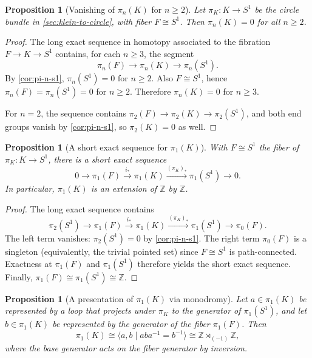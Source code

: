 \documentclass[11pt,a4paper]{article}
\newtheorem{proposition}[theorem]{Proposition}
\theoremstyle{definition}
\theoremstyle{remark}
\begin{document}
\begin{proposition}[Vanishing of \(\pi_n(K)\) for \(n\ge 2\)]
\label{prop:pi-n-klein}
Let \(\pi_K:K\to S^1\) be the circle bundle in \cref{sec:klein-to-circle}, with fiber \(F\cong S^1\). Then \(\pi_n(K)=0\) for all \(n\ge 2\).
\end{proposition}

\begin{proof}
The long exact sequence in homotopy associated to the fibration \(F\to K\to S^1\) contains, for each \(n\ge 3\), the segment
\[
\pi_n(F)\to \pi_n(K)\to \pi_n(S^1).
\]
By \cref{cor:pi-n-s1}, \(\pi_n(S^1)=0\) for \(n\ge 2\). Also \(F\cong S^1\), hence \(\pi_n(F)=\pi_n(S^1)=0\) for \(n\ge 2\). Therefore \(\pi_n(K)=0\) for \(n\ge 3\).

For \(n=2\), the sequence contains \(\pi_2(F)\to \pi_2(K)\to \pi_2(S^1)\), and both end groups vanish by \cref{cor:pi-n-s1}, so \(\pi_2(K)=0\) as well.
\end{proof}

\begin{proposition}[A short exact sequence for \(\pi_1(K)\)]
\label{prop:pi1-short-exact}
With \(F\cong S^1\) the fiber of \(\pi_K:K\to S^1\), there is a short exact sequence
\[
0 \longrightarrow \pi_1(F) \xrightarrow{i_*} \pi_1(K) \xrightarrow{(\pi_K)_*} \pi_1(S^1) \longrightarrow 0.
\]
In particular, \(\pi_1(K)\) is an extension of \(\mathbb{Z}\) by \(\mathbb{Z}\).
\end{proposition}

\begin{proof}
The long exact sequence contains
\[
\pi_2(S^1)\to \pi_1(F)\xrightarrow{i_*}\pi_1(K)\xrightarrow{(\pi_K)_*}\pi_1(S^1)\to \pi_0(F).
\]
The left term vanishes: \(\pi_2(S^1)=0\) by \cref{cor:pi-n-s1}. The right term \(\pi_0(F)\) is a singleton (equivalently, the trivial pointed set) since \(F\cong S^1\) is path-connected. Exactness at \(\pi_1(F)\) and \(\pi_1(S^1)\) therefore yields the short exact sequence. Finally, \(\pi_1(F)\cong\pi_1(S^1)\cong \mathbb{Z}\).
\end{proof}

\begin{proposition}[A presentation of \(\pi_1(K)\) via monodromy]
\label{prop:pi1-klein-presentation}
Let \(a\in \pi_1(K)\) be represented by a loop that projects under \(\pi_K\) to the generator of \(\pi_1(S^1)\), and let \(b\in \pi_1(K)\) be represented by the generator of the fiber \(\pi_1(F)\). Then
\[
\pi_1(K)\cong \langle a,b \mid a b a^{-1} = b^{-1}\rangle \cong \mathbb{Z}\rtimes_{(-1)}\mathbb{Z},
\]
where the base generator acts on the fiber generator by inversion.
\end{proposition}
\end{document}
